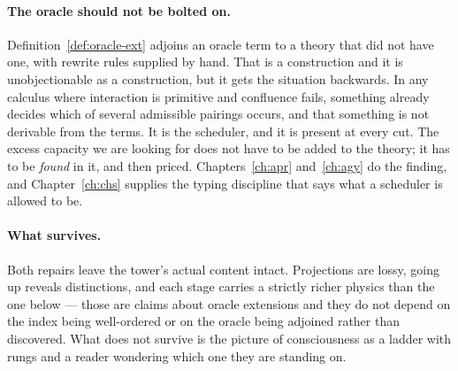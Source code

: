 \paragraph{The oracle should not be bolted on.}
Definition~\ref{def:oracle-ext} adjoins an oracle term to a theory that
did not have one, with rewrite rules supplied by hand.
That is a construction and it is unobjectionable as a construction, but
it gets the situation backwards.
In any calculus where interaction is primitive and confluence fails,
something already decides which of several admissible pairings occurs,
and that something is not derivable from the terms.
It is the scheduler, and it is present at every cut.
The excess capacity we are looking for does not have to be added
to the theory; it has to be \emph{found} in it, and then priced.
Chapters~\ref{ch:apr} and~\ref{ch:agy} do the finding, and
Chapter~\ref{ch:chs} supplies the typing discipline that says what a
scheduler is allowed to be.

\paragraph{What survives.}
Both repairs leave the tower's actual content intact.
Projections are lossy, going up reveals distinctions, and each stage
carries a strictly richer physics than the one below --- those are
claims about oracle extensions and they do not depend on the index being
well-ordered or on the oracle being adjoined rather than discovered.
What does not survive is the picture of consciousness as a ladder with
rungs and a reader wondering which one they are standing on.

